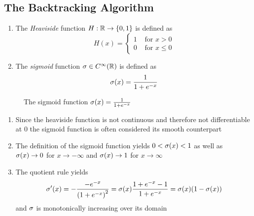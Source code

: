 \begin{algorithm}[Perceptron]\label{algo:perceptron}
\end{algorithm}
\inputminted[fontsize=\small, framesep=0.35cm, frame=lines, python3=true]{python}{python/perceptron.py}
\bigskip


\subsection{The Backtracking Algorithm}

\begin{definition}
    \hfill
    \begin{enumerate}
        \item The \emph{Heaviside} function \( H: \mathbb{R} \to \{ 0, 1 \} \) is defined as
              \[
                  H(x) = \left \{
                  \begin{array}{ll}
                      1 & \text{ for } x > 0  \\
                      0 & \text{ for }x \le 0
                  \end{array}
                  \right.
              \]
        \item The \emph{sigmoid} function \( \sigma \in C^\infty(\mathbb{R}) \) is defined as
              \[
                  \sigma(x) = \frac{1}{1 + e^{-x}}
              \]
    \end{enumerate}
\end{definition}
\bigskip


\begin{figure}[H]
    \centering
    \plotsigmoid{}
    \caption{The sigmoid function \( \sigma(x) = \frac{1}{1 + e^{-x}} \)}\label{fig:sigmoid}
\end{figure}
\bigskip


\begin{remarks}
    \hfill
    \begin{enumerate}
        \item Since the heaviside function is not continuous and therefore not differentiable at \( 0 \)
              the sigmoid function is often considered its smooth counterpart
        \item The definition of the sigmoid function yields \( 0 < \sigma(x) < 1 \) as well as
              \( \sigma(x) \to 0 \) for \( x \to -\infty \) and \( \sigma(x) \to 1 \) for \( x \to \infty \)
        \item The quotient rule yields
              \[
                  \sigma'(x)
                  = -\frac{-e^{-x}}{{(1 + e^{-x})}^2}
                  = \sigma(x) \frac{1 + e^{-x} - 1}{1 + e^{-x}}
                  = \sigma(x)(1 - \sigma(x))
              \]
              and \( \sigma \) is monotonically increasing over its domain
    \end{enumerate}
\end{remarks}
\bigskip
